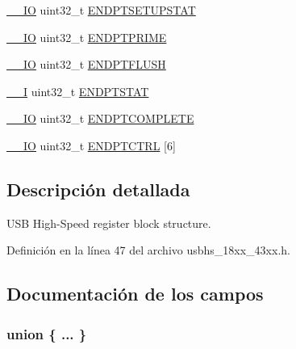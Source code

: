 \begin{DoxyCompactItemize}
\begin{tabbing}
\end{tabbing}\item 
\hyperlink{core__sc300_8h_aec43007d9998a0a0e01faede4133d6be}{\+\_\+\+\_\+\+IO} uint32\+\_\+t \hyperlink{struct_l_p_c___u_s_b_h_s___t_accba48676fff8fcbf244de513e0bafa3}{E\+N\+D\+P\+T\+S\+E\+T\+U\+P\+S\+T\+AT}
\item 
\hyperlink{core__sc300_8h_aec43007d9998a0a0e01faede4133d6be}{\+\_\+\+\_\+\+IO} uint32\+\_\+t \hyperlink{struct_l_p_c___u_s_b_h_s___t_aec0e228a214e4aa40c884097c7378b20}{E\+N\+D\+P\+T\+P\+R\+I\+ME}
\item 
\hyperlink{core__sc300_8h_aec43007d9998a0a0e01faede4133d6be}{\+\_\+\+\_\+\+IO} uint32\+\_\+t \hyperlink{struct_l_p_c___u_s_b_h_s___t_aded3da9b001d55174b4f9feddbae2fe5}{E\+N\+D\+P\+T\+F\+L\+U\+SH}
\item 
\hyperlink{core__sc300_8h_af63697ed9952cc71e1225efe205f6cd3}{\+\_\+\+\_\+I} uint32\+\_\+t \hyperlink{struct_l_p_c___u_s_b_h_s___t_a0ef4c759cd3e09a6ef5ffc333f0ad582}{E\+N\+D\+P\+T\+S\+T\+AT}
\item 
\hyperlink{core__sc300_8h_aec43007d9998a0a0e01faede4133d6be}{\+\_\+\+\_\+\+IO} uint32\+\_\+t \hyperlink{struct_l_p_c___u_s_b_h_s___t_aa9bc539392d3adc43d746fd2c3f96bd0}{E\+N\+D\+P\+T\+C\+O\+M\+P\+L\+E\+TE}
\item 
\hyperlink{core__sc300_8h_aec43007d9998a0a0e01faede4133d6be}{\+\_\+\+\_\+\+IO} uint32\+\_\+t \hyperlink{struct_l_p_c___u_s_b_h_s___t_a6b661f29ba1596d4f44ce8491966c684}{E\+N\+D\+P\+T\+C\+T\+RL} \mbox{[}6\mbox{]}
\end{DoxyCompactItemize}


\subsection{Descripción detallada}
U\+SB High-\/\+Speed register block structure. 

Definición en la línea 47 del archivo usbhs\+\_\+18xx\+\_\+43xx.\+h.



\subsection{Documentación de los campos}
\subsubsection[{\texorpdfstring{"@72}{@72}}]{\setlength{\rightskip}{0pt plus 5cm}union \{ ... \} }\hypertarget{struct_l_p_c___u_s_b_h_s___t_a245837c07d01b0306c66d523161bd4a0}{}\label{struct_l_p_c___u_s_b_h_s___t_a245837c07d01b0306c66d523161bd4a0}
